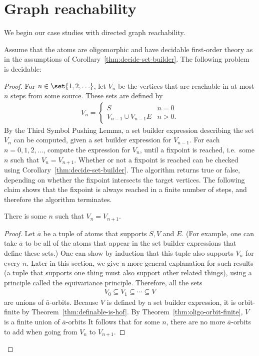 \section{Graph reachability}
\label{sec:graph-reachability}
We begin our case studies with directed graph reachability. 
\begin{theorem}\label{thm:graph-reachability}
Assume that the atoms are oligomorphic and have decidable first-order theory as in the assumptions of Corollary~\ref{thm:decide-set-builder}. The following problem is decidable:
\end{theorem}
\begin{proof} 
	For $n \in \set{1,2,\ldots}$, let $V_n$ be the vertices that are reachable in at most $n$ steps from some source. These sets are defined by 
\begin{align*}
	V_n = \begin{cases}
		S & \text{$n=0$}\\
V_{n-1} \cup V_{n-1} E & n >0.
	\end{cases} 
\end{align*} 
By the Third Symbol Pushing Lemma, a set builder expression describing the set $V_n$ can be computed, given a set builder expression for $V_{n-1}$. For each $n = 0,1,2,\ldots$, compute the expression for $V_n$, until a fixpoint is reached, i.e.~some $n$ such that $V_n= V_{n+1}$. Whether or not a fixpoint is reached can be checked using Corollary~\ref{thm:decide-set-builder}. The algorithm returns true or false, depending on whether the fixpoint intersects the target vertices. The following claim shows that the fixpoint is always reached in a finite number of steps, and therefore the algorithm terminates. 


\begin{claim}\label{claim:graph-diameter}
	There is some $n$ such that $V_n= V_{n+1}$. 
\end{claim}	
\begin{proof}
	Let $\bar a$ be a tuple of atoms that supports $S, V$ and $E$. (For example, one can take $\bar a$ to be all of the atoms that appear in the set builder expressions that define these sets.) One can show by induction that this tuple also supports $V_n$ for every $n$. Later in this section, we give a more general explanation for such results (a tuple that supports one thing must also support other related things), using a principle called the equivariance principle. 
	Therefore, all the sets 
	\begin{align*}
		V_0 \subseteq V_1 \subseteq \cdots \subseteq V
	\end{align*}
	are unions of $\bar a$-orbits. Because $V$ is defined by a set builder expression, it is orbit-finite by Theorem~\ref{thm:definable-is-hof}. By Theorem~\ref{thm:oligo-orbit-finite}, $V$ is a finite union of $\bar a$-orbits It follows that for 
	some $n$, there are no more $\bar a$-orbits to add when going from $V_n$ to $V_{n+1}$. 
\end{proof}
\end{proof}


